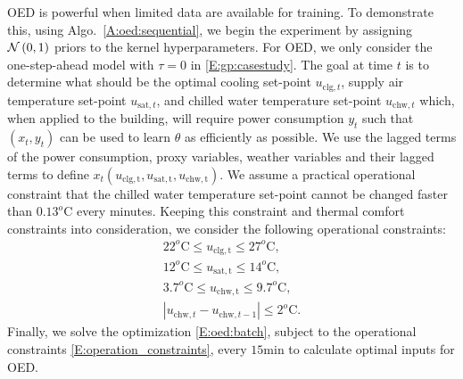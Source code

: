 OED is powerful when limited data are available for training. 
To demonstrate this, using Algo.~\ref{A:oed:sequential}, we begin the experiment by assigning \(\operatorname*{\mathcal{N}}\left(0, 1\right)\) priors to the kernel hyperparameters. %
For OED, we only consider the one-step-ahead model with \(\tau=0\) in \eqref{E:gp:casestudy}.
The goal at time \(t\) is to determine what should be the optimal cooling set-point \(u_{\mathrm{clg},t}\), supply air temperature set-point \(u_{\mathrm{sat},t}\), and chilled water temperature set-point \(u_{\mathrm{chw},t}\) which, when applied to the building, will require power consumption \(y_t\) such that \((x_t,y_t)\) can be used to learn \(\theta\) as efficiently as possible.
We use the lagged terms of the power consumption, proxy variables, weather variables and their lagged terms to define \(x_t(u_{\mathrm{clg,t}},u_{\mathrm{sat,t}},u_{\mathrm{chw,t}})\).
We assume a practical operational constraint that the chilled water temperature set-point cannot be changed faster than \(0.13^o\mathrm{C}\) every minutes.
Keeping this constraint and thermal comfort constraints into consideration, we consider the following operational constraints:
\begin{gather}
22^o\mathrm{C} \leq u_{\mathrm{clg,t}} \leq  27^o\mathrm{C}, \nonumber \\
12^o\mathrm{C} \leq u_{\mathrm{sat,t}} \leq  14^o\mathrm{C}, \nonumber \\
 3.7^o\mathrm{C} \leq u_{\mathrm{chw,t}} \leq  9.7^o\mathrm{C},\label{E:operation_constraints} \\
| u_{\mathrm{chw},t} - u_{\mathrm{chw},t-1}| \leq  2^o\mathrm{C}. \nonumber
\end{gather}
Finally, we solve the optimization \eqref{E:oed:batch}, subject to the operational constraints \eqref{E:operation_constraints}, every \(15 \mathrm{min}\) to calculate optimal inputs for OED.

